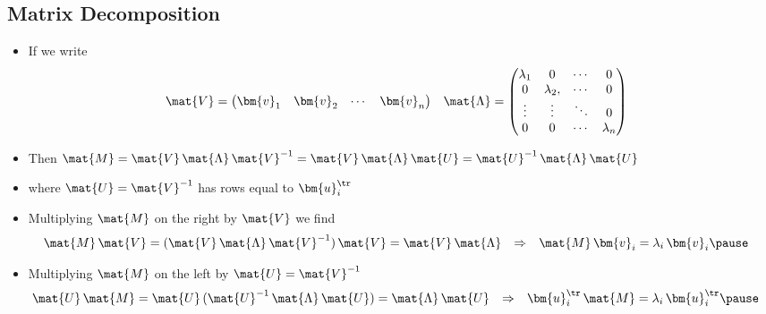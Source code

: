\begin{slide}
\section[-2]{Matrix Decomposition}

\begin{PauseHighLight}
  \begin{itemize}
  \item If we write\vspace*{-1cm}
    {\small
    \begin{align*}
      \mat{V} &=
      \begin{pmatrix}
        \bm{v}_1 & \bm{v}_2 & \cdots & \bm{v}_n
      \end{pmatrix} &
      \mat{\Lambda} &=
                      \begin{pmatrix}
                        \lambda_1 & 0 & \cdots & 0 \\
                        0 & \lambda_2, & \cdots &0 \\
                        \vdots & \vdots & \ddots &0 \\
                        0 & 0 & \cdots & \lambda_n
                      \end{pmatrix}
    \end{align*}}\vspace*{-1cm}
    \item Then $\mat{M} = \mat{V} \,
      \mat{\Lambda}\,\mat{V}^{-1} 
      = \mat{V}\,\mat{\Lambda}\,\mat{U}
      = \mat{U}^{-1}\,\mat{\Lambda}\,\mat{U}$
    \item where $\mat{U} = \mat{V}^{-1}$ has rows equal to
      $\bm{u}_i^\tr$\pause
    \item Multiplying $\mat{M}$ on the right by $\mat{V}$ we find
      \begin{align*}
        \mat{M} \, \mat{V}
        &= (\mat{V} \,\mat{\Lambda}\,\mat{V}^{-1}) \, \mat{V}
         =  \mat{V}\, \mat{\Lambda} &\Rightarrow&
        &
        \mat{M} \,\bm{v}_i &= \lambda_i \, \bm{v}_i\pause
      \end{align*}
    \item Multiplying $\mat{M}$ on the left by $\mat{U} = \mat{V}^{-1}$
      \begin{align*}
        \mat{U}\,\mat{M} &= \mat{U}\,(\mat{U}^{-1}
                           \,\mat{\Lambda}\,\mat{U})
                           =\mat{\Lambda}\,\mat{U} &\Rightarrow&
        &
         \bm{u}_i^\tr \, \mat{M} &= \lambda_i \, \bm{u}_i^\tr \pause
      \end{align*}
  \end{itemize}
\end{PauseHighLight}

\end{slide}



